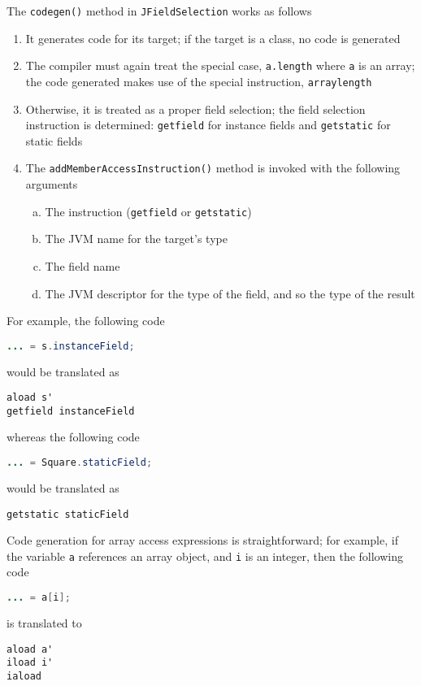 \documentclass[8pt,a4paper,compress]{beamer}
\begin{document}
\begin{frame}[fragile]
\pause

The \lstinline{codegen()} method in \lstinline{JFieldSelection} works as follows
\begin{enumerate}
\pause
\item It generates code for its target; if the target is a class, no code is generated
\pause
\item The compiler must again treat the special case, \lstinline{a.length} where \lstinline{a} is an array; the code generated makes use of the special instruction, \lstinline{arraylength}
\pause
\item Otherwise, it is treated as a proper field selection; the field selection instruction is determined: \lstinline{getfield} for instance fields and \lstinline{getstatic} for static fields
\pause
\item The \lstinline{addMemberAccessInstruction()} method is invoked with the following arguments
\begin{enumerate}[(a)]
\pause
\item The instruction (\lstinline{getfield} or \lstinline{getstatic})
\pause
\item The JVM name for the target's type
\pause
\item The field name
\pause
\item The JVM descriptor for the type of the field, and so the type of the result
\end{enumerate}
\end{enumerate}
\end{frame}

\begin{frame}[fragile]
\pause

For example, the following code
\begin{lstlisting}[language=Java]
... = s.instanceField;
\end{lstlisting}
would be translated as
\begin{lstlisting}[language={}]
aload s'
getfield instanceField
\end{lstlisting}

whereas the following code
\begin{lstlisting}[language=Java]
... = Square.staticField;
\end{lstlisting}
would be translated as
\begin{lstlisting}[language={}]
getstatic staticField
\end{lstlisting}

\pause
\bigskip

Code generation for array access expressions is straightforward; for example, if the variable \lstinline{a} references an array object, and \lstinline{i} is an integer, then the following code
\begin{lstlisting}[language=Java]
... = a[i];
\end{lstlisting}
is translated to 
\begin{lstlisting}[language={}]
aload a'
iload i'
iaload
\end{lstlisting}
\end{frame}
\end{document}
